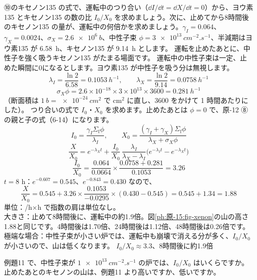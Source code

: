 \label{ph:原-15:ex11}
\begin{phreidai}[止めたあとのキセノン]
⑩のキセノン135 の式で、運転中のつり合い（$\dd I/\dd t=\dd X/\dd t=0$）から、ヨウ素135 とキセノン135 の数の比 $I_0/X_0$ を求めましょう。次に、止めてから8時間後のキセノン135 の量が、運転中の何倍かを求めましょう。$\gamma_I=0.064$、$\gamma_X=0.0024$、$\sigma_X=\qty{2.6e6}{b}$、中性子束 $\phi=\qty{3e13}{cm^{-2}.s^{-1}}$、半減期はヨウ素135 が \qty{6.58}{h}、キセノン135 が \qty{9.14}{h} とします。
\phbamen
運転を止めたあとに、中性子を強く吸うキセノン135 がたまる場面です。
\phmushi
運転中の中性子束は一定、止めた瞬間に0になるとします。ヨウ素135 が中性子を吸う分は無視します。
\phzu
\[ \lambda_I=\frac{\ln2}{6.58}=\qty{0.1053}{h^{-1}},\qquad \lambda_X=\frac{\ln2}{9.14}=\qty{0.0758}{h^{-1}} \]
\[ \sigma_X\phi=2.6\times10^{-18}\times3\times10^{13}\times3600=\qty{0.281}{h^{-1}} \]
（断面積は $\qty{1}{b}=\qty{e-24}{cm^2}$ で cm$^2$ に直し、3600 をかけて 1 時間あたりにした）。
\phriyu
つり合いの式で $I_0$・$X_0$ を求めます。止めたあとは $\phi=0$ で、原-12 ⑧の親と子の式（6-14）になります。
\phtateru
\[ I_0=\frac{\gamma_I\Sigma_{\mathrm f}\phi}{\lambda_I},\qquad X_0=\frac{(\gamma_I+\gamma_X)\Sigma_{\mathrm f}\phi}{\lambda_X+\sigma_X\phi} \]
\[ \frac{X}{X_0}=e^{-\lambda_Xt}+\frac{I_0}{X_0}\,\frac{\lambda_I}{\lambda_X-\lambda_I}\bigl(e^{-\lambda_It}-e^{-\lambda_Xt}\bigr) \]
\phtoku
\[ \frac{I_0}{X_0}=\frac{0.064}{0.0664}\times\frac{0.0758+0.281}{0.1053}=3.26 \]
$t=8$ h：$e^{-0.607}=0.545$、$e^{-0.843}=0.430$ なので、
\[ \frac{X}{X_0}=0.545+3.26\times\frac{0.1053}{-0.0295}\times(0.430-0.545)=0.545+1.34=1.88 \]
\phtashikame
単位：/h×h で指数の肩は単位なし。\\
大きさ：止めて8時間後に、運転中の約1.9倍。図\ref{ph:原-15:fig-xenon}の山の高さ1.88と同じです。4時間後は1.70倍、24時間後は1.12倍、48時間後は0.26倍です。\\
極端な場合：中性子束が小さい炉では、運転中も崩壊で消える分が多く、$I_0/X_0$ が小さいので、山は低くなります。
\kotae $I_0/X_0\approx3.3$、8時間後に約1.9倍
\end{phreidai}
\begin{jibun}
例題11 で、中性子束が $\qty{1e13}{cm^{-2}.s^{-1}}$ の炉では、$I_0/X_0$ はいくらですか。止めたあとのキセノンの山は、例題11 より高いですか、低いですか。
\end{jibun}

